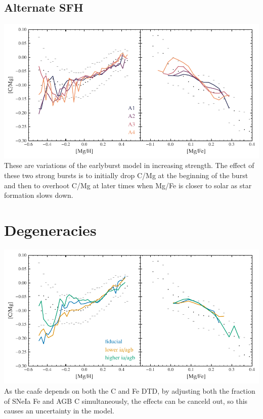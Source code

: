 \hypertarget{alternate-sfh}{%
\subsection{Alternate SFH}\label{alternate-sfh}}

\includegraphics{figures/twoexp_strength.pdf} These are variations of
the earlyburst model in increasing strength. The effect of these two
strong bursts is to initially drop C/Mg at the beginning of the burst
and then to overhoot C/Mg at later times when Mg/Fe is closer to solar
as star formation slows down.

\hypertarget{degeneracies}{%
\section{Degeneracies}\label{degeneracies}}

\includegraphics{figures/ia_agb_degeneracy.pdf} As the caafe depends on
both the C and Fe DTD, by adjusting both the fraction of SNeIa Fe and
AGB C simultaneously, the effects can be canceld out, so this causes an
uncertainty in the model.
